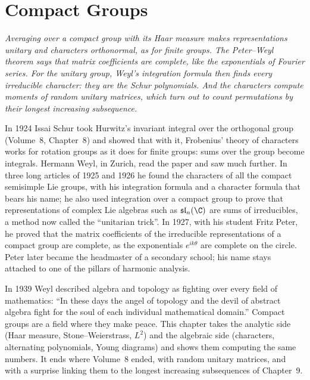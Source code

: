 \chapter{Compact Groups}

\begin{center}\itshape
Averaging over a compact group with its Haar measure makes representations unitary and characters orthonormal, as for finite groups. The Peter--Weyl theorem says that matrix coefficients are complete, like the exponentials of Fourier series. For the
unitary group, Weyl's integration formula then finds every irreducible character: they are the Schur polynomials. And the characters compute moments of random unitary matrices, which turn out to count permutations by their longest increasing subsequence.
\end{center}

In 1924 Issai Schur took Hurwitz's invariant integral over the orthogonal group (Volume~8, Chapter~8) and showed that with it, Frobenius' theory of characters works for rotation groups as it does for finite groups: sums over the group become integrals.
Hermann Weyl, in Zurich, read the paper and saw much further. In three long articles of 1925 and 1926 he found the characters of all the compact semisimple Lie groups, with his integration formula and a character formula that bears his name; he also
used integration over a compact group to prove that representations of complex Lie algebras such as $\mathfrak{sl}_n(\C)$ are sums of irreducibles, a method now called the ``unitarian trick''. In 1927, with his student Fritz Peter, he proved
that the matrix coefficients of the irreducible representations of a compact group are complete, as the exponentials $e^{ik\theta}$ are complete on the circle. Peter later became the headmaster of a secondary school; his name stays attached to one of the
pillars of harmonic analysis.

In 1939 Weyl described algebra and topology as fighting over every field of mathematics: ``In these days the angel of topology and the devil of abstract algebra fight for the soul of each individual mathematical domain.'' Compact groups are a field where they
make peace. This chapter takes the analytic side (Haar measure, Stone--Weierstrass, $L^2$) and the algebraic side (characters, alternating polynomials, Young diagrams) and shows them computing the same numbers. It ends where Volume~8 ended, with random unitary
matrices, and with a surprise linking them to the longest increasing subsequences of Chapter~9.

